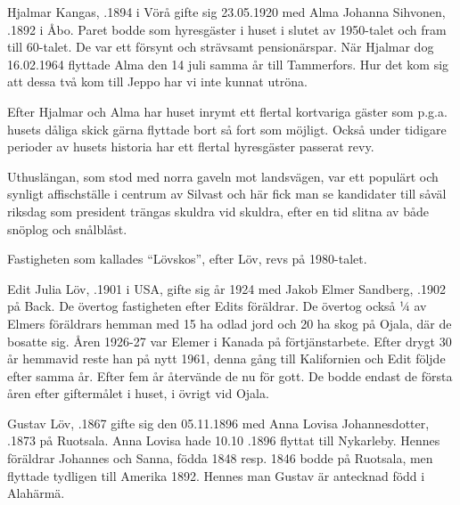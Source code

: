 

Hjalmar Kangas, .1894 i Vörå gifte sig 23.05.1920 med Alma Johanna Sihvonen, .1892 i Åbo. Paret bodde som hyresgäster i huset i slutet av 1950-talet och fram till 60-talet. De var ett försynt och strävsamt pensionärspar. När Hjalmar dog 16.02.1964 flyttade Alma den 14 juli samma år till Tammerfors. Hur det kom sig att dessa två kom till Jeppo har vi inte kunnat utröna.

Efter Hjalmar och Alma har huset inrymt ett flertal kortvariga gäster som p.g.a. husets dåliga skick gärna flyttade bort så fort som möjligt. Också under tidigare perioder av husets historia har ett flertal hyresgäster passerat revy.

Uthuslängan, som stod med norra gaveln mot landsvägen, var ett populärt och synligt affischställe i centrum av Silvast och här fick man se kandidater till såväl riksdag som president trängas skuldra vid skuldra, efter en tid slitna av både snöplog och snålblåst.

Fastigheten som kallades ``Lövskos'', efter Löv, revs på 1980-talet.


Edit Julia Löv, .1901 i USA, gifte sig år 1924 med Jakob Elmer Sandberg, .1902 på Back. De övertog fastigheten efter Edits föräldrar. De övertog också ¼ av Elmers föräldrars hemman med 15 ha odlad jord och 20 ha skog på Ojala, där de bosatte sig. Åren 1926-27 var Elemer i Kanada på förtjänstarbete. Efter drygt 30 år hemmavid reste han på nytt 1961, denna gång till Kalifornien och Edit följde efter samma år. Efter fem år återvände de nu för gott. De bodde endast de första åren efter giftermålet i huset, i övrigt vid Ojala.
\begin{jhchildren}
  \item {}
  \item {}
  \item {}
\end{jhchildren}


Gustav Löv, .1867 gifte sig den 05.11.1896 med Anna Lovisa Johannesdotter, .1873 på Ruotsala. Anna Lovisa hade 10.10 .1896 flyttat till Nykarleby. Hennes föräldrar Johannes och Sanna, födda 1848 resp. 1846 bodde på Ruotsala, men flyttade tydligen till Amerika 1892. Hennes man Gustav är antecknad född i Alahärmä.
\begin{jhchildren}
  \item {}
  \item {}
  \item {}
  \item {}
\end{jhchildren}

